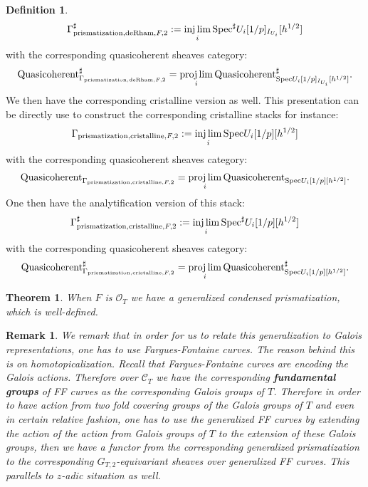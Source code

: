 \documentclass[12pt]{article}
\newtheorem{theorem}{Theorem}
\newtheorem{remark}{Remark}
\theoremstyle{definition}
\newtheorem{definition}{Definition}
\begin{document}
\begin{definition}
\begin{align}
\mathrm{\Gamma}^\sharp_{\mathrm{prismatization},\mathrm{deRham},F,2}:=\injlim_i \mathrm{Spec}^\sharp U_i[1/p]_{I_{U_i}}[h^{1/2}]
\end{align}
with the corresponding quasicoherent sheaves category:
\begin{align}
\mathrm{Quasicoherent}^\sharp_{\mathrm{\Gamma}_{\mathrm{prismatization},\mathrm{deRham},F,2}}=\projlim_i \mathrm{Quasicoherent}^\sharp_{\mathrm{Spec}U_i[1/p]_{I_{U_i}}[h^{1/2}]}.
\end{align}
We then have the corresponding cristalline version as well. This presentation can be directly use to construct the corresponding cristalline stacks for instance:
\begin{align}
\mathrm{\Gamma}_{\mathrm{prismatization},\mathrm{cristalline},F,2}:=\injlim_i \mathrm{Spec}U_i[1/p][h^{1/2}]
\end{align}
with the corresponding quasicoherent sheaves category:
\begin{align}
\mathrm{Quasicoherent}_{\mathrm{\Gamma}_{\mathrm{prismatization},\mathrm{cristalline},F,2}}=\projlim_i \mathrm{Quasicoherent}_{\mathrm{Spec}U_i[1/p][h^{1/2}]}.
\end{align}
One then have the analytification version of this stack:
\begin{align}
\mathrm{\Gamma}^\sharp_{\mathrm{prismatization},\mathrm{cristalline},F,2}:=\injlim_i \mathrm{Spec}^\sharp U_i[1/p][h^{1/2}]
\end{align}
with the corresponding quasicoherent sheaves category:
\begin{align}
\mathrm{Quasicoherent}^\sharp_{\mathrm{\Gamma}_{\mathrm{prismatization},\mathrm{cristalline},F,2}}=\projlim_i \mathrm{Quasicoherent}^\sharp_{\mathrm{Spec}U_i[1/p][h^{1/2}]}.
\end{align} 
\end{definition}


\begin{theorem}
When $F$ is $\mathcal{O}_T$ we have a generalized condensed prismatization, which is well-defined.
\end{theorem}


\begin{remark}
We remark that in order for us to relate this generalization to Galois representations, one has to use Fargues-Fontaine curves. The reason behind this is on \textit{homotopicalization}. Recall that Fargues-Fontaine curves are encoding the Galois actions. Therefore over $\mathcal{C}_T$ we have the corresponding \textbf{fundamental groups} of FF curves as the corresponding Galois groups of $T$. Therefore in order to have action from two fold covering groups of the Galois groups of $T$ and even in certain relative fashion, one has to use the generalized FF curves by extending the action of the action from Galois groups of $T$ to the extension of these Galois groups, then we have a functor from the corresponding generalized prismatization to the corresponding $G_{T,2}$-equivariant sheaves over generalized FF curves. This parallels to $z$-adic situation as well.
\end{remark}
\end{document}
